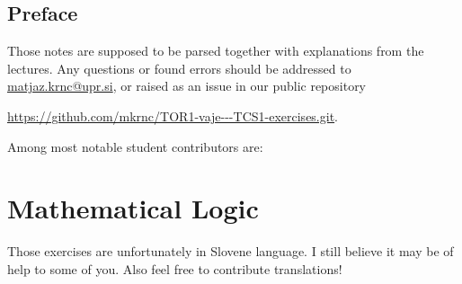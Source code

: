 \documentclass[11pt,paper=b5,footinclude,headinclude]{scrbook} %
\theoremstyle{remark}
\theoremstyle{definition} %
\theoremstyle{theorem} %
\newcommand{\myRepo}{\url{https://github.com/mkrnc/TOR1-vaje---TCS1-exercises.git}}
\begin{document}


\newpage
\section*{Preface}
   

Those notes are supposed to be parsed together with explanations from the lectures.
Any questions or found errors should be 
addressed to \url{matjaz.krnc@upr.si}, or 
raised as an issue in our public repository 
\begin{center}
    \myRepo.    
\end{center}


Among most notable student contributors are:




\tableofcontents


\chapter{Mathematical Logic}
{Those exercises are unfortunately in Slovene language. I still believe it may be of help to some of you. Also feel free to contribute translations!}
\end{document}
